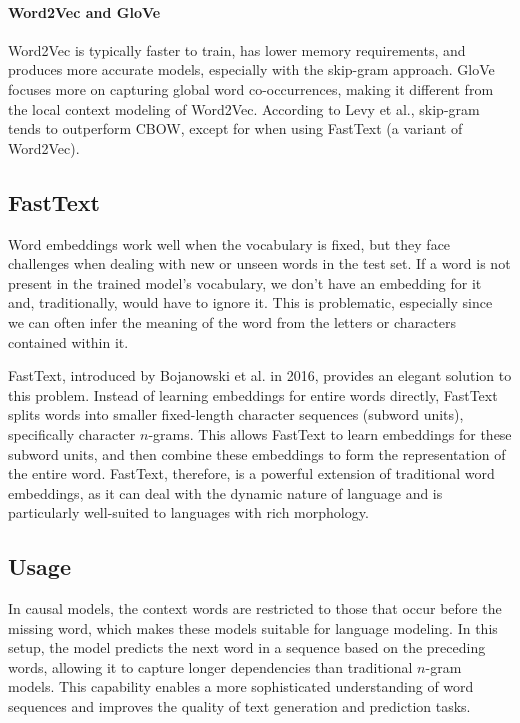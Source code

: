 \paragraph*{Word2Vec and GloVe}
Word2Vec is typically faster to train, has lower memory requirements, and produces more accurate models, especially with the skip-gram approach.
GloVe focuses more on capturing global word co-occurrences, making it different from the local context modeling of Word2Vec.
According to Levy et al., skip-gram tends to outperform CBOW, except for when using FastText (a variant of Word2Vec). 

\subsection{FastText}
Word embeddings work well when the vocabulary is fixed, but they face challenges when dealing with new or unseen words in the test set.
If a word is not present in the trained model's vocabulary, we don't have an embedding for it and, traditionally, would have to ignore it. 
This is problematic, especially since we can often infer the meaning of the word from the letters or characters contained within it.

FastText, introduced by Bojanowski et al. in 2016, provides an elegant solution to this problem. 
Instead of learning embeddings for entire words directly, FastText splits words into smaller fixed-length character sequences (subword units), specifically character $n$-grams. 
This allows FastText to learn embeddings for these subword units, and then combine these embeddings to form the representation of the entire word.
FastText, therefore, is a powerful extension of traditional word embeddings, as it can deal with the dynamic nature of language and is particularly well-suited to languages with rich morphology.

\subsection{Usage}
In causal models, the context words are restricted to those that occur before the missing word, which makes these models suitable for language modeling. 
In this setup, the model predicts the next word in a sequence based on the preceding words, allowing it to capture longer dependencies than traditional $n$-gram models. 
This capability enables a more sophisticated understanding of word sequences and improves the quality of text generation and prediction tasks.

